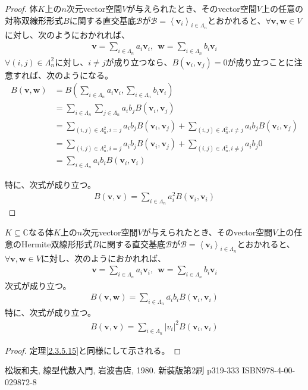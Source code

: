 \documentclass[dvipdfmx]{jsarticle}
\begin{document}
\begin{proof}
体$K$上の$n$次元vector空間$V$が与えられたとき、そのvector空間$V$上の任意の対称双線形形式$B$に関する直交基底$\mathcal{B}$が$\mathcal{B} =\left\langle \mathbf{v}_{i} \right\rangle_{i \in \varLambda_{n}}$とおかれると、$\forall\mathbf{v},\mathbf{w} \in V$に対し、次のようにおかれれば、
\begin{align*}
\mathbf{v} = \sum_{i \in \varLambda_{n}} {a_{i}\mathbf{v}_{i}},\ \ \mathbf{w} = \sum_{i \in \varLambda_{n}} {b_{i}\mathbf{v}_{i}}
\end{align*}
$\forall(i,j) \in \varLambda_{n}^{2}$に対し、$i \neq j$が成り立つなら、$B\left( \mathbf{v}_{i},\mathbf{v}_{j} \right) = 0$が成り立つことに注意すれば、次のようになる。
\begin{align*}
B\left( \mathbf{v},\mathbf{w} \right) &= B\left( \sum_{i \in \varLambda_{n}} {a_{i}\mathbf{v}_{i}},\sum_{i \in \varLambda_{n}} {b_{i}\mathbf{v}_{i}} \right)\\
&= \sum_{i \in \varLambda_{n}} {\sum_{j \in \varLambda_{n}} {a_{i}b_{j}B\left( \mathbf{v}_{i},\mathbf{v}_{j} \right)}}\\
&= \sum_{(i,j) \in \varLambda_{n}^{2} ,i = j } {a_{i}b_{j}B\left( \mathbf{v}_{i},\mathbf{v}_{j} \right)} + \sum_{(i,j) \in \varLambda_{n}^{2} ,i \neq j } {a_{i}b_{j}B\left( \mathbf{v}_{i},\mathbf{v}_{j} \right)}\\
&= \sum_{(i,j) \in \varLambda_{n}^{2} ,i = j } {a_{i}b_{j}B\left( \mathbf{v}_{i},\mathbf{v}_{j} \right)} + \sum_{(i,j) \in \varLambda_{n}^{2} ,i \neq j } {a_{i}b_{j}0}\\
&= \sum_{i \in \varLambda_{n}} {a_{i}b_{i}B\left( \mathbf{v}_{i},\mathbf{v}_{i} \right)}
\end{align*}\par
特に、次式が成り立つ。
\begin{align*}
B\left( \mathbf{v},\mathbf{v} \right) = \sum_{i \in \varLambda_{n}} {a_{i}^{2}B\left( \mathbf{v}_{i},\mathbf{v}_{i} \right)}
\end{align*}
\end{proof}
\begin{thm}\label{2.3.5.16}
$K \subseteq \mathbb{C}$なる体$K$上の$n$次元vector空間$V$が与えられたとき、そのvector空間$V$上の任意のHermite双線形形式$B$に関する直交基底$\mathcal{B}$が$\mathcal{B} =\left\langle \mathbf{v}_{i} \right\rangle_{i \in \varLambda_{n}}$とおかれると、$\forall\mathbf{v},\mathbf{w} \in V$に対し、次のようにおかれれば、
\begin{align*}
\mathbf{v} = \sum_{i \in \varLambda_{n}} {a_{i}\mathbf{v}_{i}},\ \ \mathbf{w} = \sum_{i \in \varLambda_{n}} {b_{i}\mathbf{v}_{i}}
\end{align*}
次式が成り立つ。
\begin{align*}
B\left( \mathbf{v},\mathbf{w} \right) = \sum_{i \in \varLambda_{n}} {\overline{a_{i}}b_{i}B\left( \mathbf{v}_{i},\mathbf{v}_{i} \right)}
\end{align*}
特に、次式が成り立つ。
\begin{align*}
B\left( \mathbf{v},\mathbf{v} \right) = \sum_{i \in \varLambda_{n}} {\left| v_{i} \right|^{2}B\left( \mathbf{v}_{i},\mathbf{v}_{i} \right)}
\end{align*}
\end{thm}
\begin{proof} 定理\ref{2.3.5.15}と同様にして示される。
\end{proof}
\begin{thebibliography}{50}
  松坂和夫, 線型代数入門, 岩波書店, 1980. 新装版第2刷 p319-333 ISBN978-4-00-029872-8
\end{thebibliography}
\end{document}
